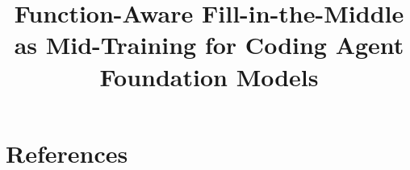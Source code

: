 \documentclass{article}
\title{Function-Aware Fill-in-the-Middle as Mid-Training for Coding Agent Foundation Models}
\author{
}
\begin{document}
\maketitle















\section*{References}




\appendix



\newpage

\end{document}
